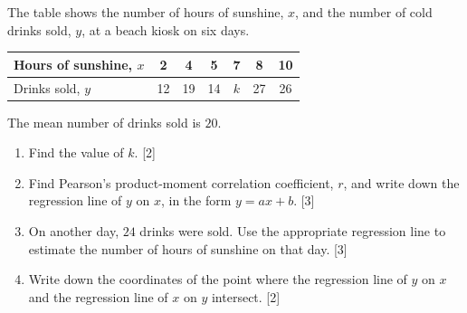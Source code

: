 \documentclass[12pt, twoside]{article}
\begin{document}
\begin{enumerate}[itemsep=0.15cm]
The table shows the number of hours of sunshine, $x$, and the number of
cold drinks sold, $y$, at a beach kiosk on six days.

\begin{center}
\setlength{\tabcolsep}{9pt}\renewcommand{\arraystretch}{1.2}
\begin{tabular}{|l|c|c|c|c|c|c|}
\hline
Hours of sunshine, $x$ & 2 & 4 & 5 & 7 & 8 & 10 \\
\hline
Drinks sold, $y$ & 12 & 19 & 14 & $k$ & 27 & 26 \\
\hline
\end{tabular}
\end{center}

The mean number of drinks sold is $20$.

\begin{enumerate}[itemsep=0.1cm]
  \item Find the value of $k$. \hfill [2]
  \item Find Pearson's product-moment correlation coefficient, $r$, and
  write down the regression line of $y$ on $x$, in the form $y = ax + b$.
  \hfill [3]
  \item On another day, $24$ drinks were sold. Use the appropriate
  regression line to estimate the number of hours of sunshine on that day.
  \hfill [3]
  \item Write down the coordinates of the point where the regression line
  of $y$ on $x$ and the regression line of $x$ on $y$ intersect. \hfill [2]
\end{enumerate}


\end{enumerate}
\end{document}
